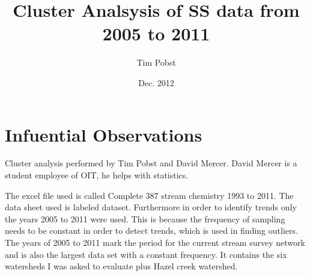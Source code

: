 \documentclass[11pt]{article} %
\title{Cluster Analsysis of SS data from 2005 to 2011}
\author{Tim Pobst}
\date{Dec. 2012} %
\begin{document}
\maketitle

\section{Infuential Observations}

Cluster analysis performed by Tim Pobst and David Mercer.  David Mercer is a student employee of OIT, he helps with statistics.
    
The excel file used is called Complete 387 stream chemistry 1993 to 2011.  The data sheet used is labeled dataset.  Furthermore in order to identify trends only the years 2005 to 2011 were used.  This is because the frequency of sampling needs to be constant in order to detect trends, which is used in finding outliers.  The years of 2005 to 2011 mark the period for the current stream survey network and is also the largest data set with a constant frequency.  It contains the six watersheds I was asked to evaluate plus Hazel creek watershed.
\end{document}
